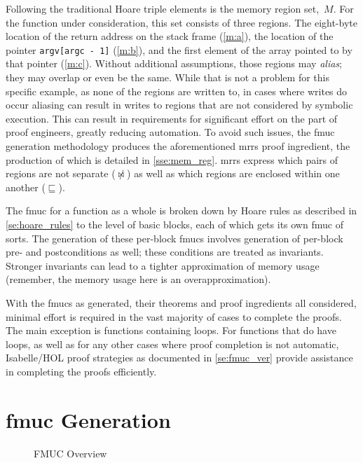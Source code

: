 Following the traditional Hoare triple elements is the memory region set,~$M$.%
For the function under consideration, this set consists of three regions.
The eight-byte location of the return address
on the stack frame (\cref{m:a}),
the location of the pointer \lstinline|argv[argc - 1]| (\cref{m:b}),
and the first element of the array pointed to by that pointer (\cref{m:c}).
Without additional assumptions, those regions may \emph{alias};%
they may overlap or even be the same.
While that is not a problem for this specific example,
as none of the regions are written to, in cases where writes do occur
aliasing can result in writes to regions
that are not considered by symbolic execution.
This can result in requirements for significant effort on the part of proof engineers,
greatly reducing automation.
To avoid such issues, the \ac{fmuc} generation methodology
produces the aforementioned \acp{mrr} proof ingredient,%
the production of which is detailed in \cref{sse:mem_reg}.
\Acp{mrr} express which pairs of regions are not separate ($\not\bowtie$)%
as well as which regions are enclosed within one another ($\sqsubseteq$).%

The \ac{fmuc} for a function as a whole is broken down by Hoare rules%
as described in \cref{se:hoare_rules} to the level of basic blocks,
each of which gets its own \ac{fmuc} of sorts.
The generation of these per-block \acp{fmuc} involves generation of per-block
pre- and postconditions as well; these conditions are treated as invariants.%
Stronger invariants can lead to a tighter approximation of memory usage%
(remember, the memory usage here is an overapproximation).

With the \acp{fmuc} as generated, their theorems and proof ingredients all considered,
minimal effort is required in the vast majority of cases to complete the proofs.
The main exception is functions containing loops.
For functions that do have loops,%
as well as for any other cases where proof completion is not automatic,
Isabelle/HOL proof strategies as documented in \cref{se:fmuc_ver}%
provide assistance in completing the proofs efficiently.

\section{\acs*{fmuc} Generation}\label{se:fmuc_gen}
\begin{figure*}
  \centering
  \caption{FMUC Overview}\label{fig:overview}
\end{figure*}


